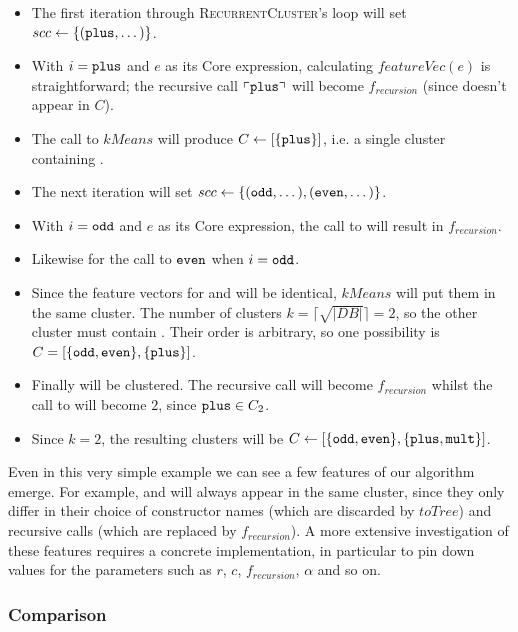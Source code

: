 \begin{itemize}
  \item The first iteration through \textsc{RecurrentCluster}'s loop will set $scc \gets \{(\texttt{plus}, \dots)\}$.
  \item With $i = \texttt{plus}$ and $e$ as its Core expression, calculating $featureVec(e)$ is straightforward; the recursive call $\left\ulcorner \texttt{plus} \right\urcorner$ will become $f_{recursion}$ (since  doesn't appear in $C$).
  \item The call to $kMeans$ will produce $C \gets [\{\texttt{plus}\}]$, i.e. a single cluster containing .
  \item The next iteration will set $scc \gets \{(\texttt{odd}, \dots), (\texttt{even}, \dots)\}$.
  \item With $i = \texttt{odd}$ and $e$ as its Core expression, the call to  will result in $f_{recursion}$.
  \item Likewise for the call to $\texttt{even}$ when $i = \texttt{odd}$.
  \item Since the feature vectors for  and  will be identical, $kMeans$ will put them in the same cluster. The number of clusters $k = \lceil \sqrt{\lvert DB \rvert} \rceil = 2$, so the other cluster must contain . Their order is arbitrary, so one possibility is $C = [\{\texttt{odd}, \texttt{even}\}, \{\texttt{plus}\}]$.
  \item Finally  will be clustered. The recursive call will become $f_{recursion}$ whilst the call to  will become $2$, since $\texttt{plus} \in C_2$.
  \item Since $k = 2$, the resulting clusters will be $C \gets [\{\texttt{odd}, \texttt{even}\}, \{\texttt{plus}, \texttt{mult}\}]$.
\end{itemize}

Even in this very simple example we can see a few features of our algorithm emerge. For example,  and  will always appear in the same cluster, since they only differ in their choice of constructor names (which are discarded by $toTree$) and recursive calls (which are replaced by $f_{recursion}$). A more extensive investigation of these features requires a concrete implementation, in particular to pin down values for the parameters such as $r$, $c$, $f_{recursion}$, $\alpha$ and so on.

\subsubsection{Comparison}

